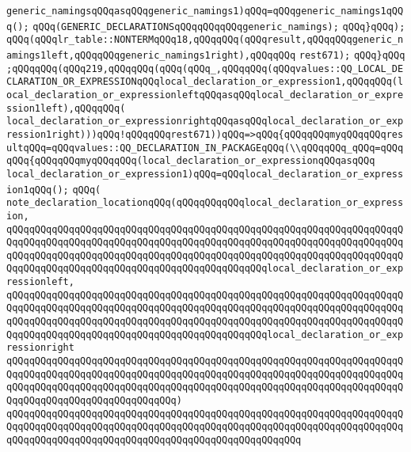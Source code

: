 \verb|generic_namingsqQQqasqQQqgeneric_namings1)qQQq=qQQqgeneric_namings1qQQq();|\newline
\verb|qQQq(GENERIC_DECLARATIONSqQQqqQQqqQQqgeneric_namings);|\newline
\verb|qQQq}qQQq);|\newline
\verb|qQQq(qQQqlr_table::NONTERMqQQq18,qQQqqQQq(qQQqresult,qQQqqQQqgeneric_namings1left,qQQqqQQqgeneric_namings1right),qQQqqQQq|\newline
\verb|rest671);|\newline
\verb|qQQq}qQQq|\newline
\verb|;qQQqqQQq(qQQq219,qQQqqQQq(qQQq(qQQq_,qQQqqQQq(qQQqvalues::QQ_LOCAL_DECLARATION_OR_EXPRESSIONqQQqlocal_declaration_or_expression1,qQQqqQQq(local_declaration_or_expressionleftqQQqasqQQqlocal_declaration_or_expression1left),qQQqqQQq(|\newline
\verb|local_declaration_or_expressionrightqQQqasqQQqlocal_declaration_or_expression1right)))qQQq!qQQqqQQqrest671))qQQq=>qQQq{qQQqqQQqmyqQQqqQQqresultqQQq=qQQqvalues::QQ_DECLARATION_IN_PACKAGEqQQq(\\qQQqqQQq_qQQq=qQQqqQQq{qQQqqQQqmyqQQqqQQq(local_declaration_or_expressionqQQqasqQQq|\newline
\verb|local_declaration_or_expression1)qQQq=qQQqlocal_declaration_or_expression1qQQq();|\newline
\verb|qQQq(|\newline
\verb|note_declaration_locationqQQq(qQQqqQQqqQQqlocal_declaration_or_expression,|\newline
\verb|qQQqqQQqqQQqqQQqqQQqqQQqqQQqqQQqqQQqqQQqqQQqqQQqqQQqqQQqqQQqqQQqqQQqqQQqqQQqqQQqqQQqqQQqqQQqqQQqqQQqqQQqqQQqqQQqqQQqqQQqqQQqqQQqqQQqqQQqqQQqqQQqqQQqqQQqqQQqqQQqqQQqqQQqqQQqqQQqqQQqqQQqqQQqqQQqqQQqqQQqqQQqqQQqqQQqqQQqqQQqqQQqqQQqqQQqqQQqqQQqqQQqqQQqqQQqqQQqlocal_declaration_or_expressionleft,|\newline
\verb|qQQqqQQqqQQqqQQqqQQqqQQqqQQqqQQqqQQqqQQqqQQqqQQqqQQqqQQqqQQqqQQqqQQqqQQqqQQqqQQqqQQqqQQqqQQqqQQqqQQqqQQqqQQqqQQqqQQqqQQqqQQqqQQqqQQqqQQqqQQqqQQqqQQqqQQqqQQqqQQqqQQqqQQqqQQqqQQqqQQqqQQqqQQqqQQqqQQqqQQqqQQqqQQqqQQqqQQqqQQqqQQqqQQqqQQqqQQqqQQqqQQqqQQqqQQqqQQqlocal_declaration_or_expressionright|\newline
\verb|qQQqqQQqqQQqqQQqqQQqqQQqqQQqqQQqqQQqqQQqqQQqqQQqqQQqqQQqqQQqqQQqqQQqqQQqqQQqqQQqqQQqqQQqqQQqqQQqqQQqqQQqqQQqqQQqqQQqqQQqqQQqqQQqqQQqqQQqqQQqqQQqqQQqqQQqqQQqqQQqqQQqqQQqqQQqqQQqqQQqqQQqqQQqqQQqqQQqqQQqqQQqqQQqqQQqqQQqqQQqqQQqqQQqqQQqqQQqqQQq)|\newline
\verb|qQQqqQQqqQQqqQQqqQQqqQQqqQQqqQQqqQQqqQQqqQQqqQQqqQQqqQQqqQQqqQQqqQQqqQQqqQQqqQQqqQQqqQQqqQQqqQQqqQQqqQQqqQQqqQQqqQQqqQQqqQQqqQQqqQQqqQQqqQQqqQQqqQQqqQQqqQQqqQQqqQQqqQQqqQQqqQQqqQQqqQQqqQQqqQQq|\newline
